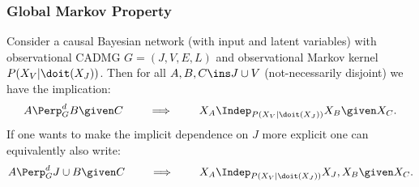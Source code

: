 \subsubsection{Global Markov Property}

\begin{Thm}
\label{thm-gmp-mI-CBN}
Consider a causal Bayesian network (with input and latent variables) with observational CADMG $G=(J,V,E,L)$ 
and observational Markov kernel $P(X_V|\doit(X_J))$.
Then for all $A, B, C \ins J \cup V$ (not-necessarily disjoint) we have the implication:
\[ A \Perp^d_G B \given C \qquad \implies \qquad X_A \Indep_{P(X_V|\doit(X_J))} X_B \given X_C.   \]
If one wants to make the implicit dependence on $J$ more explicit one can equivalently also write:
\[ A \Perp^d_G J \cup B \given C \qquad \implies \qquad X_A \Indep_{P(X_V|\doit(X_J))} X_J,X_{B} \given X_C.   \]
\end{Thm}

